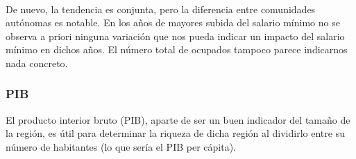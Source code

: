 \documentclass[11pt]{article}
\begin{document}
    \begin{center}
    \end{center}
    { \hspace*{\fill} \\}
    
    De nuevo, la tendencia es conjunta, pero la diferencia entre comunidades
autónomas es notable. En los años de mayores subida del salario mínimo
no se observa a priori ninguna variación que nos pueda indicar un
impacto del salario mínimo en dichos años. El número total de ocupados
tampoco parece indicarnos nada concreto.

    \subsubsection{PIB}\label{pib}

    El producto interior bruto (PIB), aparte de ser un buen indicador del
tamaño de la región, es útil para determinar la riqueza de dicha región
al dividirlo entre su número de habitantes (lo que sería el PIB per
cápita).
\end{document}
